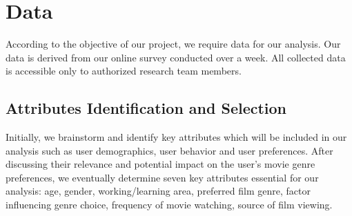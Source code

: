 \section{Data}
According to the objective of our project, we require data for our analysis. Our data is derived from our online survey conducted over a week. All collected data is accessible only to authorized research team members.
    \subsection{Attributes Identification and Selection}
    Initially, we brainstorm and identify key attributes which will be included in our analysis such as user demographics, user behavior and user preferences. After discussing their relevance and potential impact on the user’s movie genre preferences, we eventually determine seven key attributes essential for our analysis: age, gender, working/learning area, preferred film genre, factor influencing genre choice, frequency of movie watching, source of film viewing.
            
